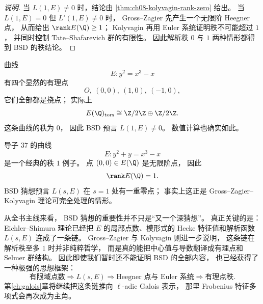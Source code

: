 \begin{proof}[说明]
当 $L(1,E)\neq 0$ 时，结论由 \cref{thm:ch08-kolyvagin-rank-zero} 给出。
当 $L(1,E)=0$ 但 $L'(1,E)\neq 0$ 时，
Gross--Zagier 先产生一个无限阶 Heegner 点，
从而给出 $\rank E(\Q)\ge 1$；
Kolyvagin 再用 Euler 系统证明秩不可能超过 $1$，
并同时控制 Tate--Shafarevich 群的有限性。
因此解析秩 $0$ 与 $1$ 两种情形都得到 BSD 的秩结论。
\end{proof}

\begin{example}[秩 $0$ 的经典例子]
\label{ex:ch08-rank0}
曲线
\[
  E\colon y^2=x^3-x
\]
有四个显然的有理点
\[
  O,\ (0,0),\ (1,0),\ (-1,0),
\]
它们全部都是挠点；
实际上
\[
  E(\Q)_{\mathrm{tors}}\cong \Z/2\Z\oplus \Z/2\Z.
\]
这条曲线的秩为 $0$，
因此 BSD 预言 $L(1,E)\neq0$。
数值计算也确实如此。
\end{example}

\begin{example}[秩 $1$ 的经典模曲线例子]
\label{ex:ch08-rank1}
导子 $37$ 的曲线
\[
  E\colon y^2+y=x^3-x
\]
是一个经典的秩 $1$ 例子。
点 $(0,0)\in E(\Q)$ 是无限阶点，
因此
\[
  \rank E(\Q)=1.
\]
BSD 猜想预言 $L(s,E)$ 在 $s=1$ 处有一重零点；
事实上这正是 Gross--Zagier--Kolyvagin 理论可完全处理的情形。
\end{example}

从全书主线来看，
BSD 猜想的重要性并不只是“又一个深猜想”。
真正关键的是：
Eichler--Shimura 理论已经把 $E$ 的局部点数、模形式的 Hecke 特征值和解析函数 $L(s,E)$ 连成了一条链。
Gross--Zagier 与 Kolyvagin 则进一步说明，
这条链在解析秩至多 $1$ 时并非纯粹哲学，
而是真的能把中心值与导数翻译成有理点和 Selmer 群结构。
因此即使我们暂时还不能证明 BSD 的全部内容，
也已经获得了一种极强的思想框架：
\[
  \text{有限域点数}
  \Longrightarrow
  L(s,E)
  \Longrightarrow
  \text{Heegner 点与 Euler 系统}
  \Longrightarrow
  \text{有理点秩}.
\]
第\ref{ch:galois}章将继续把这条链推向 $\ell$-adic Galois 表示，
那里 Frobenius 特征多项式会再次成为主角。

